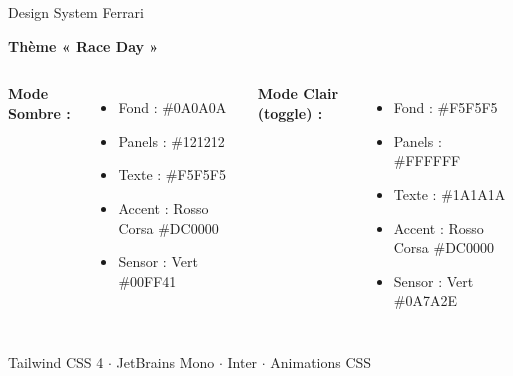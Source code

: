 \documentclass[11pt,aspectratio=169]{beamer}
\begin{document}
\begin{frame}{Design System Ferrari}
  \begin{center}
    \textbf{\textcolor{ferrariRed}{\Large Th\`eme « Race Day »}}
  \end{center}

  \vspace{0.3cm}
  \begin{columns}
    \textbf{Mode Sombre :} \\[0.2cm]
    \begin{itemize}
      \item Fond : \#0A0A0A
      \item Panels : \#121212
      \item Texte : \#F5F5F5
      \item Accent : Rosso Corsa \#DC0000
      \item Sensor : Vert \#00FF41
    \end{itemize}

    \textbf{Mode Clair (toggle) :} \\[0.2cm]
    \begin{itemize}
      \item Fond : \#F5F5F5
      \item Panels : \#FFFFFF
      \item Texte : \#1A1A1A
      \item Accent : Rosso Corsa \#DC0000
      \item Sensor : Vert \#0A7A2E
    \end{itemize}
  \end{columns}

  \vspace{0.3cm}
  \begin{center}
    \textcolor{ferrariMuted}{Tailwind CSS 4 $\cdot$ JetBrains Mono $\cdot$ Inter $\cdot$ Animations CSS}
  \end{center}
\end{frame}
\end{document}
